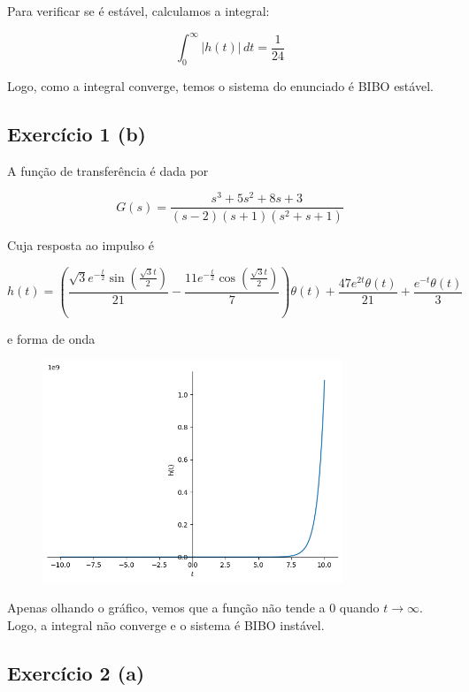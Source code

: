 \documentclass[12pt]{scrartcl}
\begin{document}
Para verificar se é estável, calculamos a integral:

\[ \int_{0}^{\infty} \left| h(t) \right| \, dt = \frac{1}{24} \]

Logo, como a integral converge, temos o sistema do enunciado é BIBO estável.

\subsection*{Exercício 1 (b)}

A função de transferência é dada por

\[ G(s) = \frac{s^{3} + 5 s^{2} + 8 s + 3}{\left(s - 2\right) \left(s + 1\right) \left(s^{2} + s + 1\right)} \]

Cuja resposta ao impulso é

\[ h(t) = \left(\frac{\sqrt{3} e^{- \frac{t}{2}} \sin{\left(\frac{\sqrt{3} t}{2} \right)}}{21} - \frac{11 e^{- \frac{t}{2}} \cos{\left(\frac{\sqrt{3} t}{2} \right)}}{7}\right) \theta\left(t\right) + \frac{47 e^{2 t} \theta\left(t\right)}{21} + \frac{e^{- t} \theta\left(t\right)}{3} \]

e forma de onda 

\begin{figure}[h!]
	\begin{center}
    \includegraphics[width=0.8\textwidth,trim=1 1 1 1,clip]{ex1b.png}
	\end{center}
\end{figure}

Apenas olhando o gráfico, vemos que a função não tende a 0 quando $t \rightarrow \infty$.
Logo, a integral não converge e o sistema é BIBO instável.

\subsection*{Exercício 2 (a)}
\end{document}
